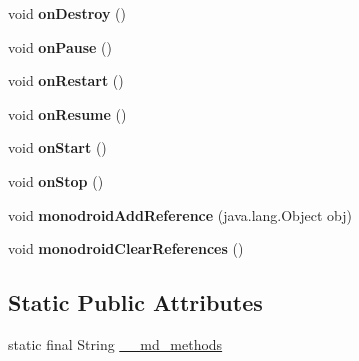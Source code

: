 \begin{DoxyCompactItemize}
void {\bfseries on\+Destroy} ()
\item 
\mbox{\label{classmd5b60ffeb829f638581ab2bb9b1a7f4f3f_1_1FormsApplicationActivity_ab60f995ef62dc4facec3f9f33cff8a55}} 
void {\bfseries on\+Pause} ()
\item 
\mbox{\label{classmd5b60ffeb829f638581ab2bb9b1a7f4f3f_1_1FormsApplicationActivity_aa1824a9a5587af10b534406d8b8bc137}} 
void {\bfseries on\+Restart} ()
\item 
\mbox{\label{classmd5b60ffeb829f638581ab2bb9b1a7f4f3f_1_1FormsApplicationActivity_abf7623ad3707e398b62e6a98b23091c8}} 
void {\bfseries on\+Resume} ()
\item 
\mbox{\label{classmd5b60ffeb829f638581ab2bb9b1a7f4f3f_1_1FormsApplicationActivity_a14cbfd53ce03eda40b28f39d28f24464}} 
void {\bfseries on\+Start} ()
\item 
\mbox{\label{classmd5b60ffeb829f638581ab2bb9b1a7f4f3f_1_1FormsApplicationActivity_a64374f0d736d5898daa13bf81ca1f3a0}} 
void {\bfseries on\+Stop} ()
\item 
\mbox{\label{classmd5b60ffeb829f638581ab2bb9b1a7f4f3f_1_1FormsApplicationActivity_a2c4010f783599213a274f63e6d5fd3d3}} 
void {\bfseries monodroid\+Add\+Reference} (java.\+lang.\+Object obj)
\item 
\mbox{\label{classmd5b60ffeb829f638581ab2bb9b1a7f4f3f_1_1FormsApplicationActivity_a837c4f559a7030eedd33be67a0272eaf}} 
void {\bfseries monodroid\+Clear\+References} ()
\end{DoxyCompactItemize}
\subsection*{Static Public Attributes}
\begin{DoxyCompactItemize}
\item 
static final String \hyperlink{classmd5b60ffeb829f638581ab2bb9b1a7f4f3f_1_1FormsApplicationActivity_a37d533299315e969b66527bb86dba664}{\+\_\+\+\_\+md\+\_\+methods}
\end{DoxyCompactItemize}
